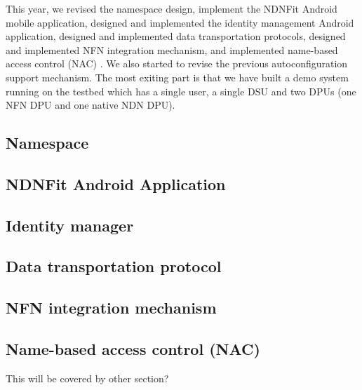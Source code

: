 \documentclass{article}
\begin{document}
This year, we revised the namespace design, implement the NDNFit Android mobile application, designed and implemented the identity management Android application, designed and implemented data transportation protocols, designed and implemented NFN integration mechanism, and implemented name-based access control (NAC) \cite{yu2015name}. We also started to revise the previous autoconfiguration support mechanism. The most exiting part is that we have built a demo system running on the testbed which has a single user, a single DSU and two DPUs (one NFN DPU and one native NDN DPU).

\subsection{Namespace}

\subsection{NDNFit Android Application}

\subsection{Identity manager}

\subsection{Data transportation protocol}

\subsection{NFN integration mechanism}

\subsection{Name-based access control (NAC)}
This will be covered by other section?
\end{document}
